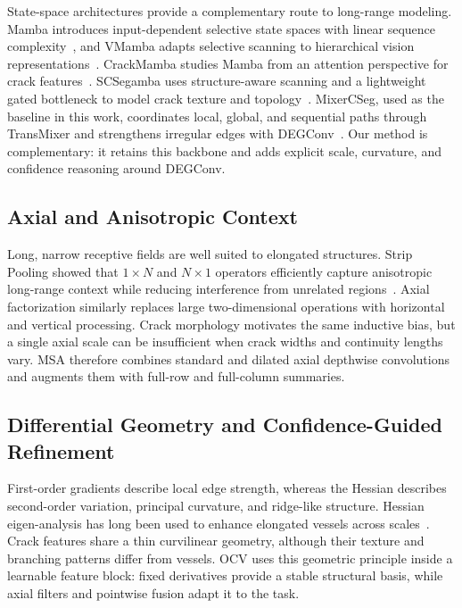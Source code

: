 \documentclass[preprint,12pt]{elsarticle}
\begin{document}
State-space architectures provide a complementary route to long-range modeling. Mamba introduces input-dependent selective state spaces with linear sequence complexity~\cite{gu2024mamba}, and VMamba adapts selective scanning to hierarchical vision representations~\cite{liu2024vmamba}. CrackMamba studies Mamba from an attention perspective for crack features~\cite{he2024crackmamba}. SCSegamba uses structure-aware scanning and a lightweight gated bottleneck to model crack texture and topology~\cite{liu2025scsegamba}. MixerCSeg, used as the baseline in this work, coordinates local, global, and sequential paths through TransMixer and strengthens irregular edges with DEGConv~\cite{zhao2026mixercseg}. Our method is complementary: it retains this backbone and adds explicit scale, curvature, and confidence reasoning around DEGConv.

\subsection{Axial and Anisotropic Context}

Long, narrow receptive fields are well suited to elongated structures. Strip Pooling showed that $1\times N$ and $N\times1$ operators efficiently capture anisotropic long-range context while reducing interference from unrelated regions~\cite{hou2020strip}. Axial factorization similarly replaces large two-dimensional operations with horizontal and vertical processing. Crack morphology motivates the same inductive bias, but a single axial scale can be insufficient when crack widths and continuity lengths vary. MSA therefore combines standard and dilated axial depthwise convolutions and augments them with full-row and full-column summaries.

\subsection{Differential Geometry and Confidence-Guided Refinement}

First-order gradients describe local edge strength, whereas the Hessian describes second-order variation, principal curvature, and ridge-like structure. Hessian eigen-analysis has long been used to enhance elongated vessels across scales~\cite{frangi1998vessel}. Crack features share a thin curvilinear geometry, although their texture and branching patterns differ from vessels. OCV uses this geometric principle inside a learnable feature block: fixed derivatives provide a stable structural basis, while axial filters and pointwise fusion adapt it to the task.
\end{document}
